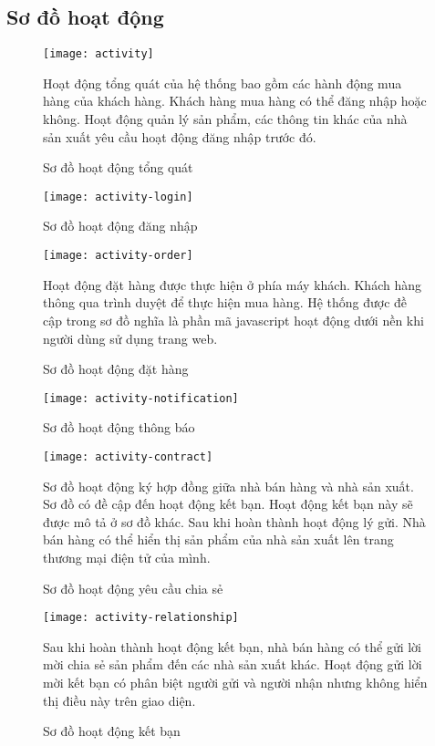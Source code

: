 \fontsize{13px}{13px}\selectfont\justifying

\clearpage
\subsection{Sơ đồ hoạt động}
\begin{figure}[h]\fontsize{13px}{13px}\selectfont
	\centering
	\texttt{[image: activity]}
	\caption{Sơ đồ hoạt động tổng quát}
	\justifying
	Hoạt động tổng quát của hệ thống bao gồm các hành động mua hàng của khách hàng. Khách hàng mua hàng có thể đăng nhập hoặc không. Hoạt động quản lý sản phẩm, các thông tin khác của nhà sản xuất yêu cầu hoạt động đăng nhập trước đó.
\end{figure}


\begin{figure}[h!]\fontsize{13px}{13px}\selectfont
	\begin{center}	
		\texttt{[image: activity-login]}
		\caption{Sơ đồ hoạt động đăng nhập}
	\end{center}
\end{figure}


\begin{figure}[t]\fontsize{13px}{13px}\selectfont
\centering
		\texttt{[image: activity-order]}
		\caption{Sơ đồ hoạt động đặt hàng}
\justifying
Hoạt động đặt hàng được thực hiện ở phía máy khách. Khách hàng thông qua trình duyệt để thực hiện mua hàng. Hệ thống được đề cập trong sơ đồ nghĩa là phần mã javascript hoạt động dưới nền khi người dùng sử dụng trang web.
\end{figure}
\begin{figure}[btp]\fontsize{13px}{13px}\selectfont
	\begin{center}	
		\texttt{[image: activity-notification]}
		\caption{Sơ đồ hoạt động thông báo}
	\end{center}
\end{figure}


\clearpage
\begin{figure}[t]\fontsize{13px}{13px}\selectfont
	\centering
		\texttt{[image: activity-contract]}
		\caption{Sơ đồ hoạt động yêu cầu chia sẻ}
	\justifying
	Sơ đồ hoạt động ký hợp đồng giữa nhà bán hàng và nhà sản xuất. Sơ đồ có đề cập đến hoạt động kết bạn. Hoạt động kết bạn này sẽ được mô tả ở sơ đồ khác. Sau khi hoàn thành hoạt động lý gửi. Nhà bán hàng có thể hiển thị sản phẩm của nhà sản xuất lên trang thương mại điện tử của mình.
\end{figure}

\begin{figure}[h]\fontsize{13px}{13px}\selectfont
\centering
		\texttt{[image: activity-relationship]}
		\caption{Sơ đồ hoạt động kết bạn}
\justifying
Sau khi hoàn thành hoạt động kết bạn, nhà bán hàng có thể gửi lời mời chia sẻ sản phẩm đến các nhà sản xuất khác. Hoạt động gửi lời mời kết bạn có phân biệt người gửi và người nhận nhưng không hiển thị điều này trên giao diện.
\end{figure}
